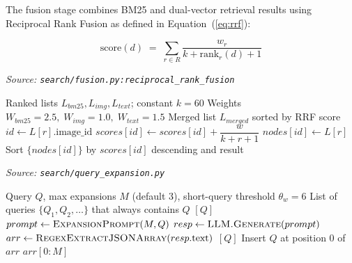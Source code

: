 The fusion stage combines BM25 and dual-vector retrieval results using Reciprocal Rank Fusion as defined in Equation~(\ref{eq:rrf}):

\begin{equation}
\label{eq:rrf}
\text{score}(d) \;=\; \sum_{r \in R} \frac{w_r}{k + \text{rank}_r(d) + 1}
\end{equation}

\begin{algorithm}[H]
\caption{Reciprocal Rank Fusion (RRF) for Hybrid Retrieval}\label{alg:rrf}
\textit{Source: \texttt{search/fusion.py:reciprocal\_rank\_fusion}}
\begin{algorithmic}[1]
\Require Ranked lists $L_{bm25}, L_{img}, L_{text}$; constant $k=60$
\Require Weights $W_{bm25}=2.5,\; W_{img}=1.0,\; W_{text}=1.5$
\Ensure Merged list $L_{merged}$ sorted by RRF score
        \State $id \gets L[r].\text{image\_id}$
        \State $scores[id] \gets scores[id] + \dfrac{w}{k + r + 1}$
        \State $nodes[id] \gets L[r]$\EndIf
    \EndFor
\EndProcedure
\State {}
\State {}
\State {}
\State Sort $\{nodes[id]\}$ by $scores[id]$ descending and \Return result
\end{algorithmic}
\end{algorithm}

\begin{algorithm}[H]
\caption{Query Expansion with Short-Query Gate}\label{alg:expand_query}
\textit{Source: \texttt{search/query\_expansion.py}}
\begin{algorithmic}[1]
\Require Query $Q$, max expansions $M$ (default 3), short-query threshold $\theta_{w}=6$
\Ensure List of queries $\{Q_1, Q_2, \ldots\}$ that always contains $Q$
    \State \Return $[Q]$\EndIf
    \State $prompt \gets \textsc{ExpansionPrompt}(M, Q)$
    \State $resp \gets \textsc{LLM.Generate}(prompt)$
    \State $arr \gets \textsc{RegexExtractJSONArray}(resp.\text{text})$
    \State \Return $[Q]$\EndIf
    \State Insert $Q$ at position 0 of $arr$\EndIf
    \State \Return $arr[0\!:\!M]$
\EndFunction
\end{algorithmic}
\end{algorithm}


